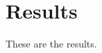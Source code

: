 \documentclass[../main.tex]{subfiles}
\begin{document}
\section{Results}

These are the results.
\end{document}
